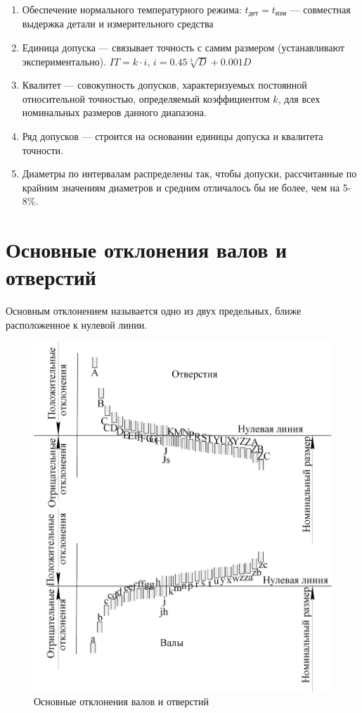 \begin{enumerate}
	\item Обеспечение нормального температурного режима: $t_{дет} = t_{изм}$ --- совместная выдержка детали и измерительного средства
	\item Единица допуска --- связывает точность с самим размером (устанавливают экспериментально). $IT = k \cdot i$, $i = 0.45 \sqrt[3]{D} + 0.001D$
	\item Квалитет --- совокупность допусков, характеризуемых постоянной относительной точностью, определяемый коэффициентом $k$, для всех номинальных размеров данного диапазона.
	\item Ряд допусков --- строится на основании единицы допуска и квалитета точности.
	\item Диаметры по интервалам распределены так, чтобы допуски, рассчитанные по крайним значениям диаметров и средним отличалось бы не более, чем на 5-8\%.
\end{enumerate}

\section{Основные отклонения валов и отверстий}

Основным отклонением называется одно из двух предельных, ближе расположенное к нулевой линии.

\begin{figure}
	\centering
	\includegraphics[width=0.7\linewidth]{pic/1_3}
	\caption{Основные отклонения валов и отверстий}
	\label{fig:13}
\end{figure}

